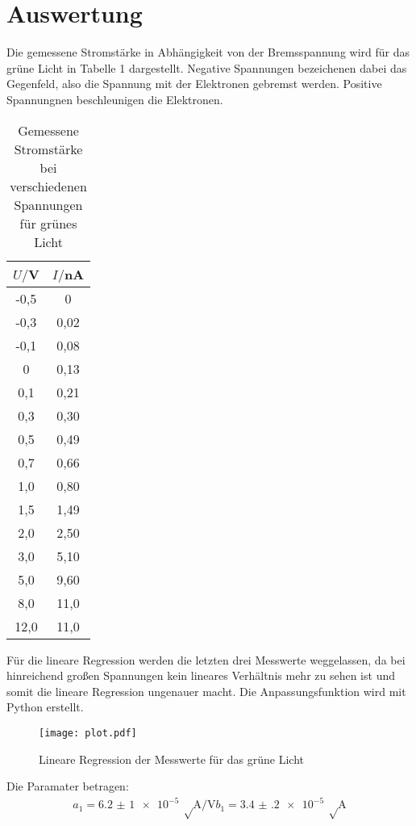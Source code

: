 \section{Auswertung}
\label{sec:Auswertung}



Die gemessene Stromstärke in Abhängigkeit von der Bremsspannung wird für das grüne
Licht in Tabelle 1 dargestellt. Negative Spannungen bezeichenen dabei das Gegenfeld, also
die Spannung mit der Elektronen gebremst werden. Positive Spannungnen beschleunigen die Elektronen.


\begin{table}[H]
  \centering
  \caption{Gemessene Stromstärke bei verschiedenen Spannungen für grünes Licht}
  \label{tab:Spannungsamplitude}
  \begin{tabular}{c c}
    \toprule
    $U/$V & $I/$nA \\
    \midrule
    -0,5 & 0 \\
    -0,3 & 0,02 \\
    -0,1 & 0,08 \\
     0	 & 0,13 \\
     0,1 & 0,21 \\
     0,3 & 0,30 \\
     0,5 & 0,49 \\
     0,7 & 0,66 \\
     1,0 & 0,80 \\
     1,5 & 1,49 \\
     2,0 & 2,50 \\
     3,0 & 5,10 \\
     5,0 & 9,60 \\
     8,0 & 11,0 \\
    12,0 & 11,0 \\
    \bottomrule
  \end{tabular}
\end{table}

Für die lineare Regression werden die letzten drei Messwerte weggelassen, da bei hinreichend
großen Spannungen kein lineares Verhältnis mehr zu sehen ist und somit die lineare Regression
ungenauer macht. Die Anpassungsfunktion wird mit Python erstellt.

\begin{figure}
  \centering
  \texttt{[image: plot.pdf]}
  \caption{Lineare Regression der Messwerte für das grüne Licht}
  \label{fig:plot}
\end{figure}

Die Paramater betragen:
\begin{align*}
  a_1 = \SI{6,2(1)e-5}{\sqrt\ampere\per\volt}
  b_1 = \SI{3.4(2)e-5}{\sqrt\ampere}
\end{align*}

